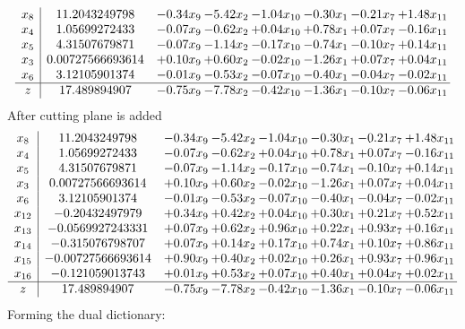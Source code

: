 \documentclass[8pt]{article}
\begin{document}
\[\begin{array}{c| c c@{\hskip 2pt} c@{\hskip 2pt} c@{\hskip 2pt} c@{\hskip 2pt} c@{\hskip 2pt} c@{\hskip 2pt} }
 x_{8}   &  11.2043249798 & -0.34 x_{9} & -5.42 x_{2} & -1.04 x_{10} & -0.30 x_{1} & -0.21 x_{7} & +  1.48 x_{11}\\
 x_{4}   &  1.05699272433 & -0.07 x_{9} & -0.62 x_{2} & +  0.04 x_{10} & +  0.78 x_{1} & +  0.07 x_{7} & -0.16 x_{11}\\
 x_{5}   &  4.31507679871 & -0.07 x_{9} & -1.14 x_{2} & -0.17 x_{10} & -0.74 x_{1} & -0.10 x_{7} & +  0.14 x_{11}\\
 x_{3}   &  0.00727566693614 & +  0.10 x_{9} & +  0.60 x_{2} & -0.02 x_{10} & -1.26 x_{1} & +  0.07 x_{7} & +  0.04 x_{11}\\
 x_{6}   &  3.12105901374 & -0.01 x_{9} & -0.53 x_{2} & -0.07 x_{10} & -0.40 x_{1} & -0.04 x_{7} & -0.02 x_{11}\\
\hline
z    &  17.489894907 & -0.75 x_{9} & -7.78 x_{2} & -0.42 x_{10} & -1.36 x_{1} & -0.10 x_{7} & -0.06 x_{11}\\
\end{array}\]
 After cutting plane is added 
\[\begin{array}{c| c c@{\hskip 2pt} c@{\hskip 2pt} c@{\hskip 2pt} c@{\hskip 2pt} c@{\hskip 2pt} c@{\hskip 2pt} }
 x_{8}   &  11.2043249798 & -0.34 x_{9} & -5.42 x_{2} & -1.04 x_{10} & -0.30 x_{1} & -0.21 x_{7} & +  1.48 x_{11}\\
 x_{4}   &  1.05699272433 & -0.07 x_{9} & -0.62 x_{2} & +  0.04 x_{10} & +  0.78 x_{1} & +  0.07 x_{7} & -0.16 x_{11}\\
 x_{5}   &  4.31507679871 & -0.07 x_{9} & -1.14 x_{2} & -0.17 x_{10} & -0.74 x_{1} & -0.10 x_{7} & +  0.14 x_{11}\\
 x_{3}   &  0.00727566693614 & +  0.10 x_{9} & +  0.60 x_{2} & -0.02 x_{10} & -1.26 x_{1} & +  0.07 x_{7} & +  0.04 x_{11}\\
 x_{6}   &  3.12105901374 & -0.01 x_{9} & -0.53 x_{2} & -0.07 x_{10} & -0.40 x_{1} & -0.04 x_{7} & -0.02 x_{11}\\
 x_{12}   &  -0.20432497979 & +  0.34 x_{9} & +  0.42 x_{2} & +  0.04 x_{10} & +  0.30 x_{1} & +  0.21 x_{7} & +  0.52 x_{11}\\
 x_{13}   &  -0.0569927243331 & +  0.07 x_{9} & +  0.62 x_{2} & +  0.96 x_{10} & +  0.22 x_{1} & +  0.93 x_{7} & +  0.16 x_{11}\\
 x_{14}   &  -0.315076798707 & +  0.07 x_{9} & +  0.14 x_{2} & +  0.17 x_{10} & +  0.74 x_{1} & +  0.10 x_{7} & +  0.86 x_{11}\\
 x_{15}   &  -0.00727566693614 & +  0.90 x_{9} & +  0.40 x_{2} & +  0.02 x_{10} & +  0.26 x_{1} & +  0.93 x_{7} & +  0.96 x_{11}\\
 x_{16}   &  -0.121059013743 & +  0.01 x_{9} & +  0.53 x_{2} & +  0.07 x_{10} & +  0.40 x_{1} & +  0.04 x_{7} & +  0.02 x_{11}\\
\hline
z    &  17.489894907 & -0.75 x_{9} & -7.78 x_{2} & -0.42 x_{10} & -1.36 x_{1} & -0.10 x_{7} & -0.06 x_{11}\\
\end{array}\]
Forming the dual dictionary:
\end{document}
